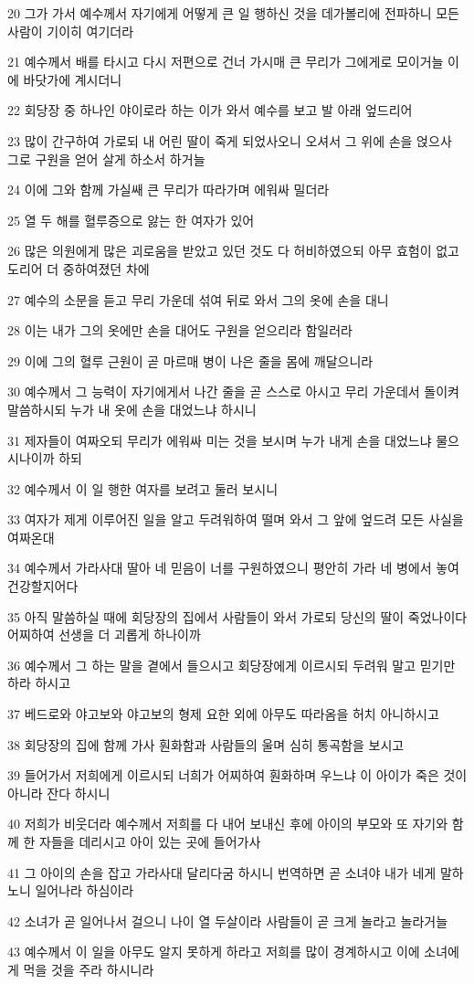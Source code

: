 \par 20 그가 가서 예수께서 자기에게 어떻게 큰 일 행하신 것을 데가볼리에 전파하니 모든 사람이 기이히 여기더라
\par 21 예수께서 배를 타시고 다시 저편으로 건너 가시매 큰 무리가 그에게로 모이거늘 이에 바닷가에 계시더니
\par 22 회당장 중 하나인 야이로라 하는 이가 와서 예수를 보고 발 아래 엎드리어
\par 23 많이 간구하여 가로되 내 어린 딸이 죽게 되었사오니 오셔서 그 위에 손을 얹으사 그로 구원을 얻어 살게 하소서 하거늘
\par 24 이에 그와 함께 가실쌔 큰 무리가 따라가며 에워싸 밀더라
\par 25 열 두 해를 혈루증으로 앓는 한 여자가 있어
\par 26 많은 의원에게 많은 괴로움을 받았고 있던 것도 다 허비하였으되 아무 효험이 없고 도리어 더 중하여졌던 차에
\par 27 예수의 소문을 듣고 무리 가운데 섞여 뒤로 와서 그의 옷에 손을 대니
\par 28 이는 내가 그의 옷에만 손을 대어도 구원을 얻으리라 함일러라
\par 29 이에 그의 혈루 근원이 곧 마르매 병이 나은 줄을 몸에 깨달으니라
\par 30 예수께서 그 능력이 자기에게서 나간 줄을 곧 스스로 아시고 무리 가운데서 돌이켜 말씀하시되 누가 내 옷에 손을 대었느냐 하시니
\par 31 제자들이 여짜오되 무리가 에워싸 미는 것을 보시며 누가 내게 손을 대었느냐 물으시나이까 하되
\par 32 예수께서 이 일 행한 여자를 보려고 둘러 보시니
\par 33 여자가 제게 이루어진 일을 알고 두려워하여 떨며 와서 그 앞에 엎드려 모든 사실을 여짜온대
\par 34 예수께서 가라사대 딸아 네 믿음이 너를 구원하였으니 평안히 가라 네 병에서 놓여 건강할지어다
\par 35 아직 말씀하실 때에 회당장의 집에서 사람들이 와서 가로되 당신의 딸이 죽었나이다 어찌하여 선생을 더 괴롭게 하나이까
\par 36 예수께서 그 하는 말을 곁에서 들으시고 회당장에게 이르시되 두려워 말고 믿기만 하라 하시고
\par 37 베드로와 야고보와 야고보의 형제 요한 외에 아무도 따라옴을 허치 아니하시고
\par 38 회당장의 집에 함께 가사 훤화함과 사람들의 울며 심히 통곡함을 보시고
\par 39 들어가서 저희에게 이르시되 너희가 어찌하여 훤화하며 우느냐 이 아이가 죽은 것이 아니라 잔다 하시니
\par 40 저희가 비웃더라 예수께서 저희를 다 내어 보내신 후에 아이의 부모와 또 자기와 함께 한 자들을 데리시고 아이 있는 곳에 들어가사
\par 41 그 아이의 손을 잡고 가라사대 달리다굼 하시니 번역하면 곧 소녀야 내가 네게 말하노니 일어나라 하심이라
\par 42 소녀가 곧 일어나서 걸으니 나이 열 두살이라 사람들이 곧 크게 놀라고 놀라거늘
\par 43 예수께서 이 일을 아무도 알지 못하게 하라고 저희를 많이 경계하시고 이에 소녀에게 먹을 것을 주라 하시니라

